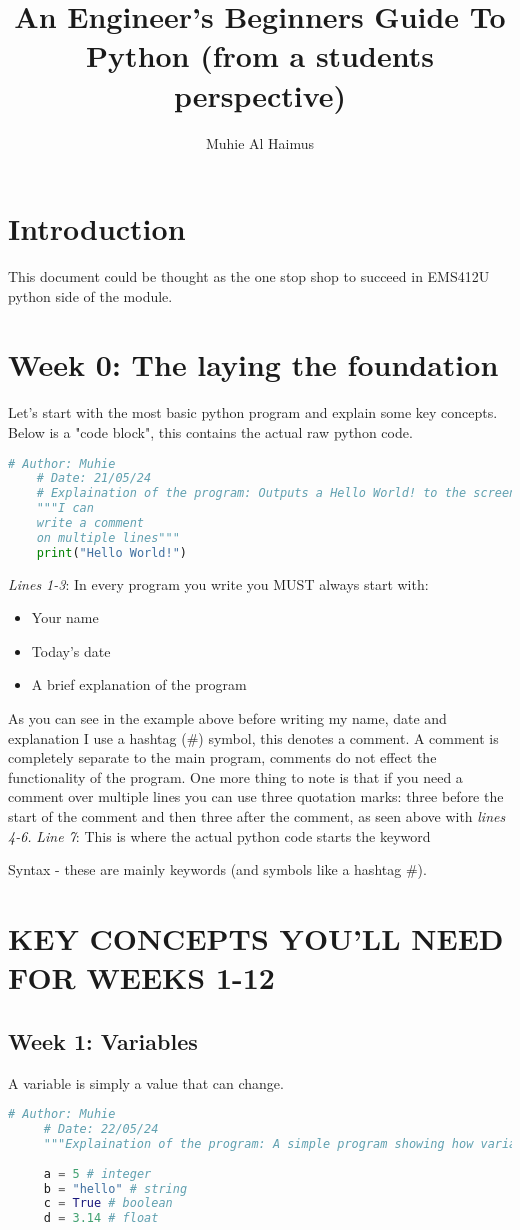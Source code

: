 \documentclass{article}
\title{An Engineer's Beginners Guide To Python (from a students perspective)}
\author{Muhie Al Haimus}
\begin{document}
	\maketitle
	\section{Introduction}
	This document could be thought as the one stop shop to succeed in EMS412U python side of the module.  
	 \section{Week 0: The laying the foundation}
	 Let's start with the most basic python program and explain some key concepts. Below is a "code block", this contains the actual raw python code.
	 
	\begin{lstlisting}[language=Python]
	# Author: Muhie
	# Date: 21/05/24
	# Explaination of the program: Outputs a Hello World! to the screen
	"""I can
	write a comment 
	on multiple lines"""
	print("Hello World!")
	\end{lstlisting}
	\emph{Lines 1-3}: In every program you write you MUST always start with:
	\begin{itemize}
		\item{Your name}
		\item{Today's date}
		\item{A brief explanation of the program}
	\end{itemize}
	As you can see in the example above before writing my name, date and explanation I use a hashtag (\#) symbol, this denotes a comment. A comment is completely separate to the main program, comments do not effect the functionality of the program. One more thing to note is that if you need a comment over multiple lines you can use three quotation marks: three before the start of the comment and then three after the comment, as seen above with \emph{lines 4-6.}
	\vspace{2mm}
	\emph{Line 7}: This is where the actual python code starts the keyword  
	
	
	 Syntax - these are mainly keywords (and symbols like a hashtag \#).
	 
	 
	 \section{KEY CONCEPTS YOU'LL NEED FOR WEEKS 1-12}
	 \subsection{Week 1: Variables}
	 A variable is simply a value that can change.
	 \begin{lstlisting}[language=python]
	 # Author: Muhie
	 # Date: 22/05/24
	 """Explaination of the program: A simple program showing how variables can be assigned in python"""
	 
	 a = 5 # integer
	 b = "hello" # string
	 c = True # boolean
	 d = 3.14 # float
	 \end{lstlisting}
	 
\end{document}
